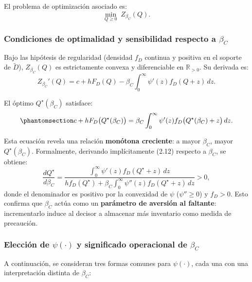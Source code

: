\documentclass[
  spanish,
  us-letterpaper,
  DIV=11,
  numbers=noendperiod]{scrreprt}
\numberwithin{equation}{section}
\begin{document}
El problema de optimización asociado es: \[
\min_{Q \geq 0} \; Z_{\beta_C}(Q).
\]

\subsubsection{\texorpdfstring{Condiciones de optimalidad y sensibilidad
respecto a
\(\beta_C\)}{Condiciones de optimalidad y sensibilidad respecto a \textbackslash beta\_C}}\label{condiciones-de-optimalidad-y-sensibilidad-respecto-a-beta_c}

Bajo las hipótesis de regularidad (densidad \(f_D\) continua y positiva
en el soporte de \(\tilde{D}\)), \(Z_{\beta_C}(Q)\) es estrictamente
convexa y diferenciable en \(\mathbb{R}_{>0}\). Su derivada es: \[
Z_{\beta_C}'(Q) = c + h F_D(Q) - \beta_C \int_0^\infty \psi'(z) f_D(Q + z) \, dz.
\]

El óptimo \(Q^\star(\beta_C)\) satisface:
\begin{equation}\phantomsection\label{eq-optimo_Q}{
c + h F_D\big(Q^\star(\beta_C)\big) = \beta_C \int_0^\infty \psi'(z) f_D\big(Q^\star(\beta_C) + z\big) \, dz.
}\end{equation}

Esta ecuación revela una relación \textbf{monótona creciente}: a mayor
\(\beta_C\), mayor \(Q^\star(\beta_C)\). Formalmente, derivando
implícitamente (2.12) respecto a \(\beta_C\), se obtiene: \[
\frac{d Q^\star}{d \beta_C} = 
\frac{\int_0^\infty \psi'(z) f_D(Q^\star + z) \, dz}
{h f_D(Q^\star) + \beta_C \int_0^\infty \psi''(z) f_D(Q^\star + z) \, dz} > 0,
\] donde el denominador es positivo por la convexidad de \(\psi\)
(\(\psi'' \geq 0\)) y \(f_D > 0\). Esto confirma que \(\beta_C\) actúa
como un \textbf{parámetro de aversión al faltante}: incrementarlo induce
al decisor a almacenar más inventario como medida de precaución.

\subsubsection{\texorpdfstring{Elección de \(\psi(\cdot)\) y significado
operacional de
\(\beta_C\)}{Elección de \textbackslash psi(\textbackslash cdot) y significado operacional de \textbackslash beta\_C}}\label{elecciuxf3n-de-psicdot-y-significado-operacional-de-beta_c}

A continuación, se consideran tres formas comunes para \(\psi(\cdot)\),
cada una con una interpretación distinta de \(\beta_C\):
\end{document}

